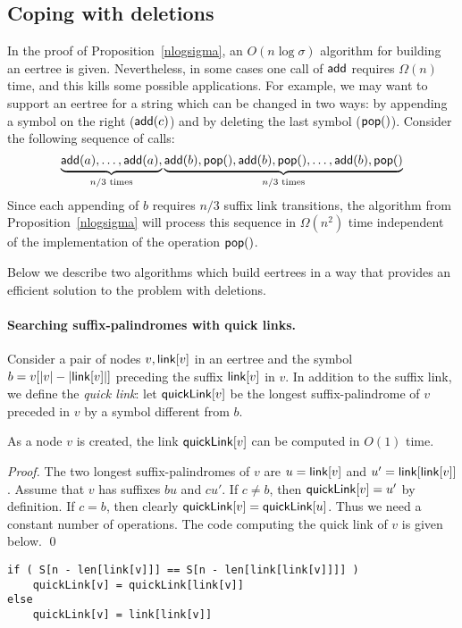 \documentclass{llncs}
\def\add{{\sf add}}
\def\link{{\sf link}}
\def\pop{{\sf pop}}
\def\quick{{\sf quickLink}}
\begin{document}
\subsection{Coping with deletions} \label{ssec:del}

In the proof of Proposition~\ref{nlogsigma}, an $O(n \log \sigma)$ algorithm for building an eertree is given. Nevertheless, in some cases one call of $\add$ requires $\Omega(n)$ time, and this kills some possible applications. For example, we may want to support an eertree for a string which can be changed in two ways: by appending a symbol on the right ($\add(c)$) and by deleting the last symbol ($\pop()$). Consider the following sequence of calls:
$$
\underbrace{\add(a), \ldots, \add(a),}_{n/3 \text{ times}}
\underbrace{\add(b), \pop(), \add(b), \pop(), \ldots, \add(b), \pop()}_{n/3 \text{ times}}
$$
Since each appending of $b$ requires $n/3$ suffix link transitions, the algorithm from Proposition~\ref{nlogsigma} will process this sequence in $\Omega(n^2)$ time independent of the implementation of the operation $\pop()$.

Below we describe two algorithms which build eertrees in a way that provides an efficient solution to the problem with deletions. 

\paragraph*{Searching suffix-palindromes with quick links.}
Consider a pair of nodes $v, \link[v]$ in an eertree and the symbol $b=v[|v|-|\link[v]|]$ preceding the suffix $\link[v]$ in $v$. In addition to the suffix link, we define the \emph{quick link}: let $\quick[v]$ be the longest suffix-palindrome of $v$ preceded in $v$ by a symbol different from $b$. 

\begin{lemma}
As a node $v$ is created, the link $\quick[v]$ can be computed in $O(1)$ time.
\end{lemma}

\begin{proof}
The two longest suffix-palindromes of $v$ are $u=\link[v]$ and $u'=\link[\link[v]]$. Assume that $v$ has suffixes $bu$ and $cu'$. If $c\ne b$, then $\quick[v]=u'$ by definition. If $c=b$, then clearly $\quick[v]=\quick[u]$. Thus we need a constant number of operations. The code computing the quick link of $v$ is given below. \qed
\end{proof}

\lstset{frame=tb,
  language=Pascal,
  aboveskip=3mm,
  belowskip=3mm,
  showstringspaces=false,
  columns=flexible,
  basicstyle=\ttfamily,
  numbers=none,
  keywordstyle=\bf,
  breaklines=true,
  breakatwhitespace=true
  tabsize=3
}
\begin{lstlisting}
if ( S[n - len[link[v]]] == S[n - len[link[link[v]]]] )
	quickLink[v] = quickLink[link[v]]
else 
	quickLink[v] = link[link[v]]
\end{lstlisting}
\end{document}
